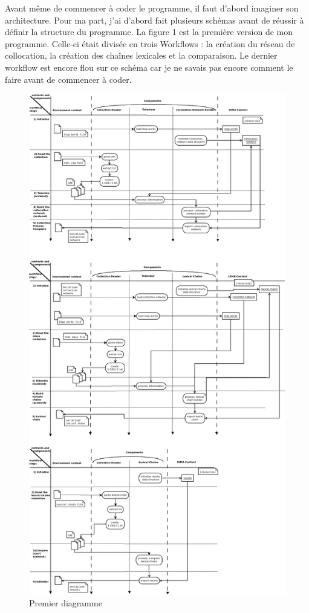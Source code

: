 \documentclass[a4paper]{article}
\begin{document}
	Avant même de commencer à coder le programme, il faut d'abord imaginer son architecture. Pour ma part, j'ai d'abord fait plusieurs schémas avant de réussir à définir la structure du programme. La figure 1 est la première version de mon programme. Celle-ci était divisée en trois Workflows : la création du réseau de collocation, la création des chaînes lexicales et la comparaison. Le dernier workflow est encore flou sur ce schéma car je ne savais pas encore comment le faire avant de commencer à coder. \\
	
	\begin{figure}[!]
  	\centering
  	\includegraphics[width=1\textwidth]{Figures/mondiagramme1.png}
  	\caption{Premier diagramme}
	\end{figure}
		
\end{document}
